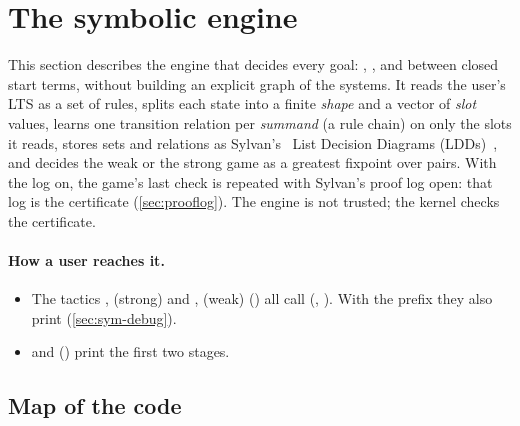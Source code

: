 \section{The symbolic engine}\label{sec:symbolic}
\begingroup\sloppy

\providecommand{\Reach}{\mathit{Reach}}
\providecommand{\Uni}{U}
\providecommand{\pre}{\mathrm{pre}}
\providecommand{\post}{\mathrm{post}}
\providecommand{\Bad}{\mathit{Bad}}
\providecommand{\Ok}{\mathit{Ok}}
\providecommand{\lddsem}[1]{[\![#1]\!]}

This section describes the engine that decides every goal:
, ,  and
 between closed start terms, without building an
explicit graph of the systems. It reads the user's LTS as a set of rules,
splits each state into a finite \emph{shape} and a vector of \emph{slot}
values, learns one transition relation per \emph{summand} (a rule chain) on
only the slots it reads, stores sets and relations as
Sylvan's~\cite{vandijk-vdpol15} List Decision Diagrams
(LDDs)~\cite{blom-vdpol08}, and decides the weak or the strong game as a
greatest fixpoint over pairs. With the log on, the game's last check is
repeated with Sylvan's proof log open: that log is the certificate
(\cref{sec:prooflog}). The engine is not trusted; the kernel checks the
certificate.

\paragraph{How a user reaches it.}
\begin{itemize}
\item The tactics ,  (strong) and ,
   (weak) () all call
   (,
  ). With the prefix  they also print
   (\cref{sec:sym-debug}).
\item {} and
   ()
  print the first two stages.
\end{itemize}

\subsection{Map of the code}

